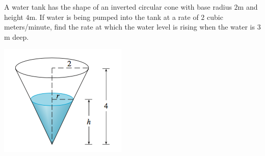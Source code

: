 \documentclass[12pt, a4paper]{article}
\begin{document}
\begin{ex}
  A water tank has the shape of an inverted circular cone with base
  radius \(2\)m and height \(4\)m. If water is being pumped into the
  tank at a rate of \(2\) cubic meters/minute, find the rate at which
  the water level is rising when the water is \(3\)m deep.
\end{ex}
\vspace{-2.2in}
\includegraphics[scale=0.5]{images/conic-water-tank}
\end{document}
